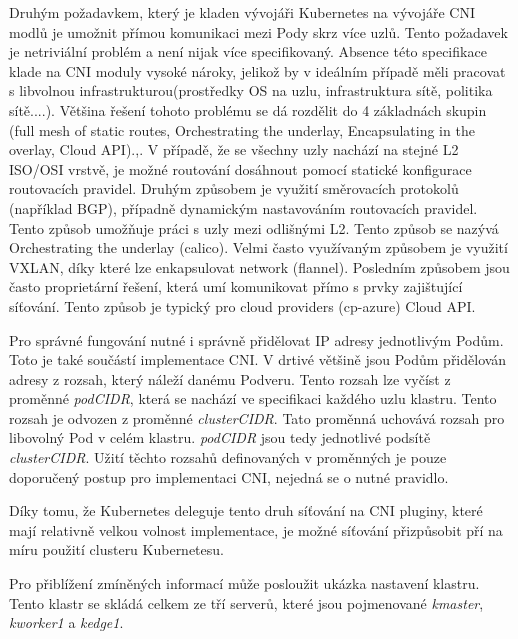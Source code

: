 Druhým požadavkem, který je kladen vývojáři Kubernetes na vývojáře CNI modlů je umožnit přímou komunikaci mezi Pody skrz více uzlů. Tento požadavek je netriviální problém a není nijak více specifikovaný. Absence této specifikace klade na CNI moduly vysoké nároky, jelikož by v ideálním případě měli pracovat s libvolnou infrastrukturou(prostředky OS na uzlu, infrastruktura sítě, politika sítě....). Většina řešení tohoto problému se dá rozdělit do 4 základnách skupin (full mesh of static routes, Orchestrating the underlay, Encapsulating in the overlay, Cloud API).\cite{kashin_2022_cni},\cite{cncfcloudnativecomputingfoundation_2019_kubernetes}. V případě, že se všechny uzly nachází na stejné L2 ISO/OSI vrstvě, je možné routování dosáhnout pomocí statické konfigurace routovacích pravidel. Druhým způsobem je využití směrovacích protokolů (například BGP), případně dynamickým nastavováním routovacích pravidel. Tento způsob umožňuje práci s uzly mezi odlišnými L2. Tento způsob se nazývá Orchestrating the underlay (calico). Velmi často využívaným způsobem je využití VXLAN, díky které lze enkapsulovat network (flannel). Posledním způsobem jsou často proprietární řešení, která umí komunikovat přímo s prvky zajištující síťování. Tento způsob je typický pro cloud providers (cp-azure) Cloud API.

Pro správné fungování nutné i správně přidělovat IP adresy jednotlivým Podům. Toto je také součástí implementace CNI. V drtivé většině jsou Podům přidělován adresy z rozsah, který náleží danému Podveru. Tento rozsah lze vyčíst z proměnné \textit{podCIDR}, která se nachází ve specifikaci každého uzlu klastru. Tento rozsah je odvozen z proměnné \textit{clusterCIDR}. Tato proměnná uchovává rozsah pro libovolný Pod v celém klastru. \textit{podCIDR} jsou tedy jednotlivé podsítě \textit{clusterCIDR}. Užití těchto rozsahů definovaných v proměnných je pouze doporučený postup pro implementaci CNI, nejedná se o nutné pravidlo.\cite{cncfcloudnativecomputingfoundation_2019_kubernetes}       

Díky tomu, že Kubernetes deleguje tento druh síťování na CNI pluginy, které mají relativně velkou volnost implementace, je možné síťování přizpůsobit pří na míru použití clusteru Kubernetesu.

Pro přiblížení zmíněných informací může posloužit ukázka nastavení klastru. Tento klastr se skládá celkem ze tří serverů, které jsou pojmenované \textit{kmaster}, \textit{kworker1} a \textit{kedge1}.
\cite{thekubernetesauthors_2023_kubectl}




